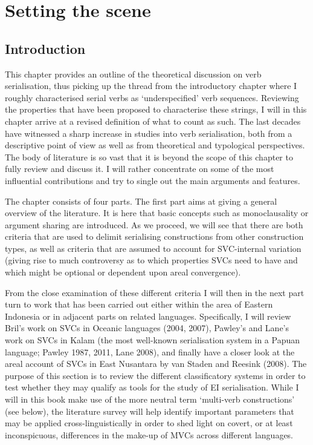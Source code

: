 \chapter{Setting the scene}\label{ch:theory}
\section{Introduction}
This chapter provides an outline of the theoretical discussion on verb serialisation, thus picking up the thread from the introductory chapter where I roughly characterised serial verbs as `underspecified' verb sequences. Reviewing the properties that have been proposed to characterise these strings, I will in this chapter arrive at a revised definition of what to count as such. The last decades have witnessed a sharp increase in studies into verb serialisation, both from a descriptive point of view as well as from theoretical and typological perspectives. The body of literature is so vast that it is beyond the scope of this chapter to fully review and discuss it. I will rather concentrate on some of the most influential contributions and try to single out the main arguments and features.

The chapter consists of four parts. The first part aims at giving a general overview of the literature. It is here that basic concepts such as monoclausality or argument sharing are introduced. As we proceed, we will see that there are both criteria that are used to delimit serialising constructions from other construction types, as well as criteria that are assumed to account for SVC-internal variation (giving rise to much controversy as to which properties SVCs need to have and which might be optional or dependent upon areal convergence). 

From the close examination of these different criteria I will then in the next part turn to work that has been carried out either within the area of Eastern Indonesia or in adjacent parts on related languages. Specifically, I will review Bril's work on SVCs in Oceanic languages (2004, 2007), Pawley's and Lane's work on SVCs in Kalam (the most well-known serialisation system in a Papuan language; Pawley 1987, 2011, Lane 2008), and finally have a closer look at the areal account of SVCs in East Nusantara by van Staden and Reesink (2008). The purpose of this section is to review the different classificatory systems in order to test whether they may qualify as tools for the study of EI serialisation. While I will in this book make use of the more neutral term `multi-verb constructions' (see below), the literature survey will help identify important parameters that may be applied cross-linguistically in order to shed light on covert, or at least inconspicuous, differences in the make-up of MVCs across different languages.

